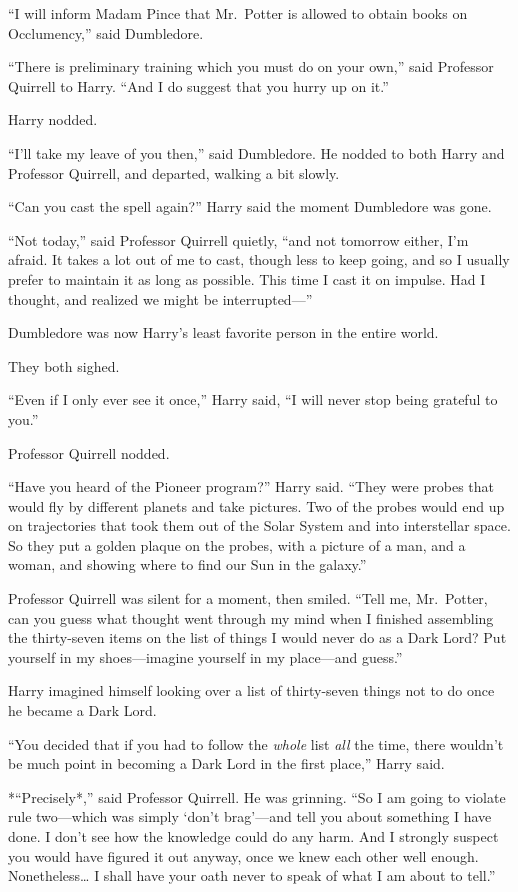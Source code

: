 ``I will inform Madam Pince that Mr.~Potter is allowed to obtain books
on Occlumency,'' said Dumbledore.

``There is preliminary training which you must do on your own,'' said
Professor Quirrell to Harry. ``And I do suggest that you hurry up on
it.''

Harry nodded.

``I'll take my leave of you then,'' said Dumbledore. He nodded to both
Harry and Professor Quirrell, and departed, walking a bit slowly.

``Can you cast the spell again?'' Harry said the moment Dumbledore was
gone.

``Not today,'' said Professor Quirrell quietly, ``and not tomorrow
either, I'm afraid. It takes a lot out of me to cast, though less to
keep going, and so I usually prefer to maintain it as long as possible.
This time I cast it on impulse. Had I thought, and realized we might be
interrupted---''

Dumbledore was now Harry's least favorite person in the entire world.

They both sighed.

``Even if I only ever see it once,'' Harry said, ``I will never stop
being grateful to you.''

Professor Quirrell nodded.

``Have you heard of the Pioneer program?'' Harry said. ``They were
probes that would fly by different planets and take pictures. Two of the
probes would end up on trajectories that took them out of the Solar
System and into interstellar space. So they put a golden plaque on the
probes, with a picture of a man, and a woman, and showing where to find
our Sun in the galaxy.''

Professor Quirrell was silent for a moment, then smiled. ``Tell me,
Mr.~Potter, can you guess what thought went through my mind when I
finished assembling the thirty-seven items on the list of things I would
never do as a Dark Lord? Put yourself in my shoes---imagine yourself in
my place---and guess.''

Harry imagined himself looking over a list of thirty-seven things not to
do once he became a Dark Lord.

``You decided that if you had to follow the \emph{whole} list \emph{all}
the time, there wouldn't be much point in becoming a Dark Lord in the
first place,'' Harry said.

*``Precisely*,'' said Professor Quirrell. He was grinning. ``So I am
going to violate rule two---which was simply `don't brag'---and tell you
about something I have done. I don't see how the knowledge could do any
harm. And I strongly suspect you would have figured it out anyway, once
we knew each other well enough. Nonetheless\ldots{} I shall have your
oath never to speak of what I am about to tell.''

